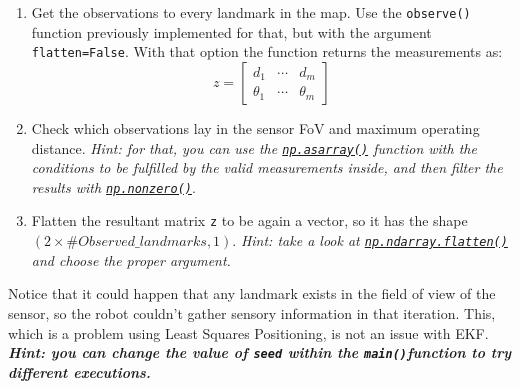 \documentclass[11pt]{article}
\providecommand{\tightlist}{%
      \setlength{\itemsep}{0pt}\setlength{\parskip}{0pt}}
\begin{document}
\begin{enumerate}
\def\labelenumi{\arabic{enumi}.}
\tightlist
\item
  Get the observations to every landmark in the map. Use the
  \texttt{observe()} function previously implemented for that, but with
  the argument \texttt{flatten=False}. With that option the function
  returns the measurements as: \[
  z = \begin{bmatrix} d_1 &  \cdots &  d_m \\ \theta_1 & \cdots & \theta_m \end{bmatrix}
  \]
\item
  Check which observations lay in the sensor FoV and maximum operating
  distance. \emph{Hint: for that, you can use the
  \href{https://docs.scipy.org/doc/numpy/reference/generated/numpy.asarray.html}{\texttt{np.asarray()}}
  function with the conditions to be fulfilled by the valid measurements
  inside, and then filter the results with
  \href{https://docs.scipy.org/doc/numpy/reference/generated/numpy.nonzero.html}{\texttt{np.nonzero()}}}.
\item
  Flatten the resultant matrix \texttt{z} to be again a vector, so it
  has the shape \((2 \times \#Observed\_landmarks,1)\). \emph{Hint: take
  a look at
  \href{https://docs.scipy.org/doc/numpy/reference/generated/numpy.ndarray.flatten.html}{\texttt{np.ndarray.flatten()}}
  and choose the proper argument.}
\end{enumerate}

Notice that it could happen that any landmark exists in the field of
view of the sensor, so the robot couldn't gather sensory information in
that iteration. This, which is a problem using Least Squares
Positioning, is not an issue with EKF. \textbf{\emph{Hint: you can
change the value of \texttt{seed} within the \texttt{main()}function to
try different executions.}}
\end{document}
